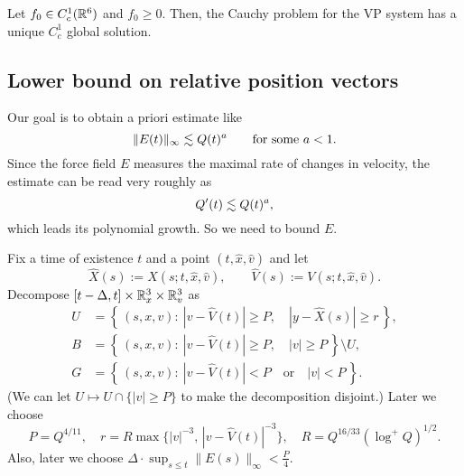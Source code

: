 \documentclass[11pt]{amsart}
\begin{document}
\begin{thm*}[Schaeffer, 1991]
Let $f_0\in C_c^1(\mathbb{R}^6)$ and $f_0\ge0$.
Then, the Cauchy problem for the VP system has a unique $C_c^1$ global solution.
\end{thm*}





\subsection{Lower bound on relative position vectors}
Our goal is to obtain a priori estimate like
\[\|E(t)\|_\infty\lesssim Q(t)^a\qquad\text{for some }a<1.\]
Since the force field $E$ measures the maximal rate of changes in velocity, the estimate can be read very roughly as
\[Q'(t)\lesssim Q(t)^a,\]
which leads its polynomial growth.
So we need to bound $E$.

Fix a time of existence $t$ and a point $(t,\hat x,\hat v)$ and let
\[\hat X(s):=X(s;t,\hat x,\hat v),\qquad\hat V(s):=V(s;t,\hat x,\hat v).\]
Decompose $[t-\Delta,t]\times\mathbb{R}_x^3\times\mathbb{R}_v^3$ as
\begin{align*}
U&=\left\{\,(s,x,v):\ |v-\hat V(t)|\ge P,\quad|y-\hat X(s)|\ge r\,\right\},\\
B&=\left\{\,(s,x,v):\ |v-\hat V(t)|\ge P,\quad|v|\ge P\,\right\}\setminus U,\\
G&=\left\{\,(s,x,v):\ |v-\hat V(t)|<P\quad\text{or}\quad|v|<P\,\right\}.
\end{align*}
(We can let $U\mapsto U\cap\{|v|\ge P\}$ to make the decomposition disjoint.)
Later we choose
\[P=Q^{4/11},\quad r=R\max\{|v|^{-3},\,|v-\hat V(t)|^{-3}\},\quad R=Q^{16/33}(\log^+Q)^{1/2}.\]
Also, later we choose $\Delta\cdot\sup_{s\le t}\|E(s)\|_\infty<\frac P4$.
\end{document}
